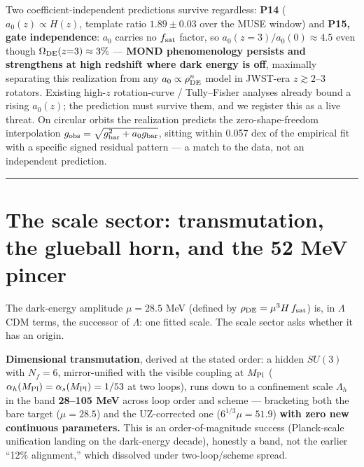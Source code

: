 \documentclass[submission, Phys]{SciPost}
\begin{document}
Two coefficient-independent predictions survive regardless: \textbf{P14}
(\(a_0(z)\propto H(z)\), template ratio \(1.89\pm0.03\) over the MUSE
window) and \textbf{P15, gate independence}: \(a_0\) carries no
\(f_{\rm sat}\) factor, so \(a_0(z{=}3)/a_0(0)\approx 4.5\) even though
\(\Omega_{\rm DE}(z{=}3)\approx 3\%\) --- \textbf{MOND phenomenology
persists and strengthens at high redshift where dark energy is off},
maximally separating this realization from any
\(a_0\propto\rho_{\rm DE}^n\) model in JWST-era \(z\gtrsim 2\)--3
rotators. Existing high-\(z\) rotation-curve / Tully--Fisher analyses
\cite{Limbach:2008aa} already bound a rising \(a_0(z)\); the prediction
must survive them, and we register this as a live threat. On circular
orbits the realization predicts the zero-shape-freedom interpolation
\(g_{\rm obs} = \sqrt{g_{\rm bar}^2 + a_0 g_{\rm bar}}\), sitting within
0.057 dex of the empirical fit with a specific signed residual pattern
--- a match to the data, not an independent prediction.

\begin{center}\rule{0.5\linewidth}{0.5pt}\end{center}

\section{The scale sector: transmutation, the glueball horn, and the 52
MeV pincer}\label{sec-5}

The dark-energy amplitude \(\mu = 28.5\) MeV (defined by
\(\rho_{\rm DE} = \mu^3 H\, f_{\rm sat}\)) is, in \(\Lambda\)CDM terms,
the successor of \(\Lambda\): one fitted scale. The scale sector asks
whether it has an origin.

\textbf{Dimensional transmutation}, derived at the stated order: a
hidden \(SU(3)\) with \(N_f = 6\), mirror-unified with the visible
coupling at \(M_{\rm Pl}\)
(\(\alpha_h(M_{\rm Pl}) = \alpha_s(M_{\rm Pl}) = 1/53\) at two loops),
runs down to a confinement scale \(\Lambda_h\) in the band
\textbf{28--105 MeV} across loop order and scheme --- bracketing both
the bare target (\(\mu = 28.5\)) and the UZ-corrected one
(\(6^{1/3}\mu = 51.9\)) \textbf{with zero new continuous parameters.}
This is an order-of-magnitude success (Planck-scale unification landing
on the dark-energy decade), honestly a band, not the earlier ``12\%
alignment,'' which dissolved under two-loop/scheme spread.
\end{document}
